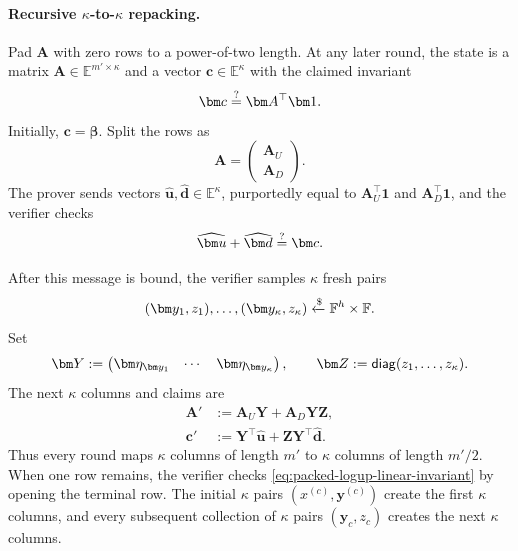 \documentclass[runningheads]{llncs}
\begin{document}
\paragraph{Recursive \(\kappa\)-to-\(\kappa\) repacking.}
Pad \(\bm A\) with zero rows to a power-of-two length.  At any later
round, the state is a matrix
\(\bm A\in\mathbb E^{m'\times\kappa}\) and a vector
\(\bm c\in\mathbb E^\kappa\) with the claimed invariant
\begin{equation}
    \bm c\EqOrNot\bm A^\top\bm1.
\label{eq:packed-logup-linear-invariant}
\end{equation}
Initially, \(\bm c=\bm\beta\).  Split the rows as
\[
    \bm A=
      \begin{pmatrix}\bm A_U\\\bm A_D\end{pmatrix}.
\]
The prover sends vectors \(\widehat{\bm u},\widehat{\bm d}
\in\mathbb E^\kappa\), purportedly equal to
\(\bm A_U^\top\bm1\) and \(\bm A_D^\top\bm1\), and the verifier checks
\begin{equation}
    \widehat{\bm u}+\widehat{\bm d}\EqOrNot\bm c.
\label{eq:packed-logup-parent-sum-check}
\end{equation}

After this message is bound, the verifier samples \(\kappa\) fresh
pairs
\[
    (\bm y_1,z_1),\ldots,(\bm y_\kappa,z_\kappa)
      \ChooseRandom\Field^h\times\Field.
\]
Set
\[
    \bm Y
      :=\begin{pmatrix}
          \bm\eta_{\bm y_1}&\cdots&\bm\eta_{\bm y_\kappa}
        \end{pmatrix},
    \qquad
    \bm Z:=\diag(z_1,\ldots,z_\kappa).
\]
The next \(\kappa\) columns and claims are
\begin{equation}
\boxed{
\begin{aligned}
    \bm A'
      &:=\bm A_U\bm Y+\bm A_D\bm Y\bm Z,\\
    \bm c'
      &:=\bm Y^\top\widehat{\bm u}
        +\bm Z\bm Y^\top\widehat{\bm d}.
\end{aligned}}
\label{eq:packed-logup-recursive-repacking}
\end{equation}
Thus every round maps \(\kappa\) columns of length \(m'\) to
\(\kappa\) columns of length \(m'/2\).  When one row remains, the
verifier checks \eqref{eq:packed-logup-linear-invariant} by opening the
terminal row.  The initial \(\kappa\) pairs
\((x^{(c)},\bm y^{(c)})\) create the first \(\kappa\) columns, and every
subsequent collection of \(\kappa\) pairs
\((\bm y_c,z_c)\) creates the next \(\kappa\) columns.
\end{document}
